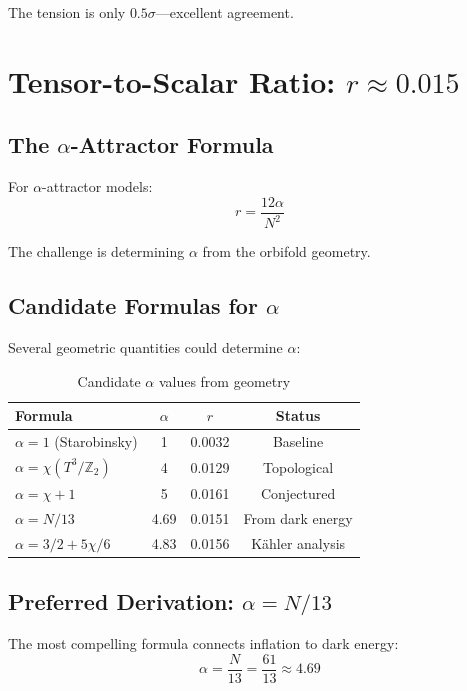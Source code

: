 \documentclass[12pt,a4paper]{article}
\begin{document}
The tension is only $0.5\sigma$---excellent agreement.

\section{Tensor-to-Scalar Ratio: $r \approx 0.015$}

\subsection{The $\alpha$-Attractor Formula}

For $\alpha$-attractor models:
\begin{equation}
r = \frac{12\alpha}{N^2}
\end{equation}

The challenge is determining $\alpha$ from the orbifold geometry.

\subsection{Candidate Formulas for $\alpha$}

Several geometric quantities could determine $\alpha$:

\begin{table}[h]
\centering
\begin{tabular}{lccc}
\toprule
Formula & $\alpha$ & $r$ & Status \\
\midrule
$\alpha = 1$ (Starobinsky) & 1 & 0.0032 & Baseline \\
$\alpha = \chi(T^3/\mathbb{Z}_2)$ & 4 & 0.0129 & Topological \\
$\alpha = \chi + 1$ & 5 & 0.0161 & Conjectured \\
$\alpha = N/13$ & 4.69 & 0.0151 & From dark energy \\
$\alpha = 3/2 + 5\chi/6$ & 4.83 & 0.0156 & K\"ahler analysis \\
\bottomrule
\end{tabular}
\caption{Candidate $\alpha$ values from geometry}
\end{table}

\subsection{Preferred Derivation: $\alpha = N/13$}

The most compelling formula connects inflation to dark energy:
\begin{equation}
\alpha = \frac{N}{13} = \frac{61}{13} \approx 4.69
\end{equation}
\end{document}
